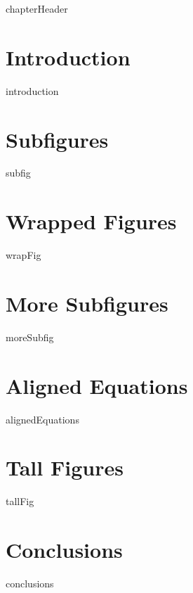{chapterHeader}%
\section{Introduction}%
\label{sec:ut:introduction}%
{introduction}%
%
\section{Subfigures}%
\label{sec:ut:subFig}%
{subfig}%

\section{Wrapped Figures}%
\label{sec:ut:wrapFig}%
{wrapFig}%

\section{More Subfigures}%
\label{sec:ut:moreSubFig}%
{moreSubfig}%

\section{Aligned Equations}%
\label{sec:ut:aligned}%
{alignedEquations}%

\section{Tall Figures}%
\label{sec:ut:tallFig}%
{tallFig}%

\section{Conclusions}%
\label{sec:ut:conclusions}%
{conclusions}%
